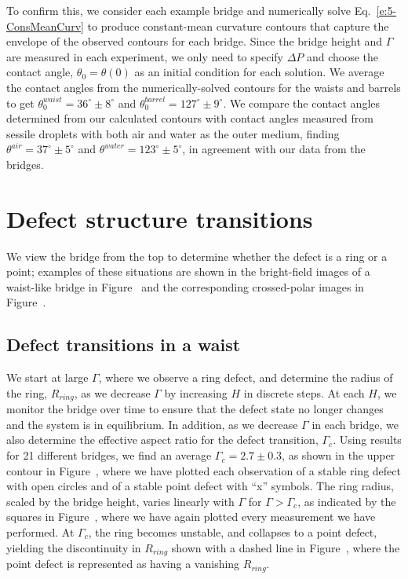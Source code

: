 To confirm this, we consider each example bridge and numerically solve Eq.~\ref{e:5-ConsMeanCurv} to produce constant-mean curvature contours that capture the envelope of the observed contours for each bridge.
Since the bridge height and $\Gamma$ are measured in each experiment, we only need to specify $\Delta P$ and choose the contact angle, $\theta_0 = \theta(0)$ as an initial condition for each solution.
We average the contact angles from the numerically-solved contours for the waists and barrels to get $\theta^{waist}_0 = 36^{\circ} \pm 8^{\circ}$ and $\theta^{barrel}_0 = 127^{\circ} \pm 9^{\circ}$.
We compare the contact angles determined from our calculated contours with contact angles measured from sessile droplets with both air and water as the outer medium, finding $\theta^{air} = 37^{\circ} \pm 5^{\circ}$ and $\theta^{water} = 123^{\circ} \pm 5^{\circ}$, in agreement with our data from the bridges.




\section{Defect structure transitions}
We view the bridge from the top to determine whether the defect is a ring or a point; examples of these situations are shown in the bright-field images of a waist-like bridge in Figure~ and the corresponding crossed-polar images in  Figure~.


\subsection{Defect transitions in a waist}
We start at large $\Gamma$, where we observe a ring defect, and determine the radius of the ring, $R_{ring}$, as we decrease $\Gamma$ by increasing $H$ in discrete steps.
At each $H$, we monitor the bridge over time to ensure that the defect state no longer changes and the system is in equilibrium.
In addition, as we decrease $\Gamma$ in each bridge, we also determine the effective aspect ratio for the defect transition, $\Gamma_c$.
Using results for 21 different bridges, we find an average $\Gamma_c = 2.7 \pm 0.3$, as shown in the upper contour in Figure~, where we have plotted each observation of a stable ring defect with open circles and of a stable point defect with ``x'' symbols.
The ring radius, scaled by the bridge height, varies linearly with $\Gamma$ for $\Gamma > \Gamma_c$, as indicated by the squares in Figure~, where we have again plotted every measurement we have performed.
At $\Gamma_c$, the  ring becomes unstable, and collapses to a point defect, yielding the discontinuity in $R_{ring}$ shown with a dashed line in Figure~, where the point defect is represented as having a vanishing $R_{ring}$.

